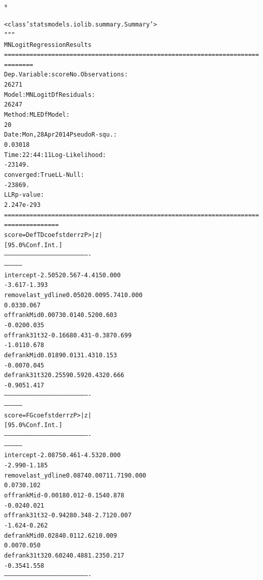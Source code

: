 \documentclass[letterpaper,10pt,english]{/anaconda/lib/python2.7/site-packages/sphinx/texinputs/sphinxhowto}
\def\smaller{\fontsize{9.5pt}{9.5pt}\selectfont}
\newenvironment{InvisibleVerbatim}
        {\begin{mdframed}[leftmargin=0.1\linewidth,innerleftmargin=3pt,innerrightmargin=3pt, userdefinedwidth=1\linewidth, linewidth=0pt, linecolor=white, usetwoside=false]}
        {\end{mdframed}}
\begin{document}
                \makebox[0.1\linewidth]{\smaller\hfill\tt\color{nbframe-out-prompt}Out\hspace{4pt}{[}15{]}:\hspace{4pt}}\\*
                \vspace{-2.55\baselineskip}\begin{InvisibleVerbatim}
                \vspace{-0.5\baselineskip}
\begin{alltt}<class 'statsmodels.iolib.summary.Summary'>
"""
                          MNLogit Regression Results
======================================================================
========
Dep. Variable:                  score   No. Observations:
26271
Model:                        MNLogit   Df Residuals:
26247
Method:                           MLE   Df Model:
20
Date:                Mon, 28 Apr 2014   Pseudo R-squ.:
0.03018
Time:                        22:44:11   Log-Likelihood:
-23149.
converged:                       True   LL-Null:
-23869.
                                        LLR p-value:
2.247e-293
======================================================================
===============
      score=DefTD       coef    std err          z      P>|z|
[95.0\% Conf. Int.]
----------------------------------------------------------------------
---------------
intercept            -2.5052      0.567     -4.415      0.000
-3.617    -1.393
removelast\_ydline     0.0502      0.009      5.741      0.000
0.033     0.067
offrankMid            0.0073      0.014      0.520      0.603
-0.020     0.035
offrank31t32         -0.1668      0.431     -0.387      0.699
-1.011     0.678
defrankMid            0.0189      0.013      1.431      0.153
-0.007     0.045
defrank31t32          0.2559      0.592      0.432      0.666
-0.905     1.417
----------------------------------------------------------------------
---------------
         score=FG       coef    std err          z      P>|z|
[95.0\% Conf. Int.]
----------------------------------------------------------------------
---------------
intercept            -2.0875      0.461     -4.532      0.000
-2.990    -1.185
removelast\_ydline     0.0874      0.007     11.719      0.000
0.073     0.102
offrankMid           -0.0018      0.012     -0.154      0.878
-0.024     0.021
offrank31t32         -0.9428      0.348     -2.712      0.007
-1.624    -0.262
defrankMid            0.0284      0.011      2.621      0.009
0.007     0.050
defrank31t32          0.6024      0.488      1.235      0.217
-0.354     1.558
----------------------------------------------------------------------

\end{alltt}
\end{InvisibleVerbatim}
\end{document}
